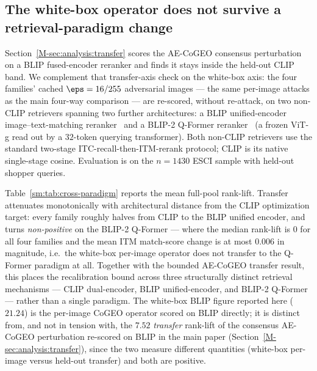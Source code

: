 \subsection{The white-box operator does not survive a retrieval-paradigm change}
\label{sm:cross-paradigm}

Section~\ref{M-sec:analysis:transfer} scores the AE-CoGEO consensus perturbation on a BLIP fused-encoder reranker and finds it stays inside the held-out CLIP band. We complement that transfer-axis check on the white-box axis: the four families' cached $\eps = 16/255$ adversarial images --- the same per-image attacks as the main four-way comparison --- are re-scored, without re-attack, on two non-CLIP retrievers spanning two further architectures: a BLIP unified-encoder image--text-matching reranker~\cite{li2022blip} and a BLIP-2 Q-Former reranker~\cite{li2023blip2} (a frozen ViT-g read out by a $32$-token querying transformer). Both non-CLIP retrievers use the standard two-stage ITC-recall-then-ITM-rerank protocol; CLIP is its native single-stage cosine. Evaluation is on the $n = 1430$ ESCI sample with held-out shopper queries.

Table~\ref{sm:tab:cross-paradigm} reports the mean full-pool rank-lift. Transfer attenuates monotonically with architectural distance from the CLIP optimization target: every family roughly halves from CLIP to the BLIP unified encoder, and turns \emph{non-positive} on the BLIP-2 Q-Former --- where the median rank-lift is $0$ for all four families and the mean ITM match-score change is at most $0.006$ in magnitude, i.e.\ the white-box per-image operator does not transfer to the Q-Former paradigm at all. Together with the bounded AE-CoGEO transfer result, this places the recalibration bound across three structurally distinct retrieval mechanisms --- CLIP dual-encoder, BLIP unified-encoder, and BLIP-2 Q-Former --- rather than a single paradigm. The white-box BLIP figure reported here ($21.24$) is the per-image CoGEO operator scored on BLIP directly; it is distinct from, and not in tension with, the $7.52$ \emph{transfer} rank-lift of the consensus AE-CoGEO perturbation re-scored on BLIP in the main paper (Section~\ref{M-sec:analysis:transfer}), since the two measure different quantities (white-box per-image versus held-out transfer) and both are positive.

